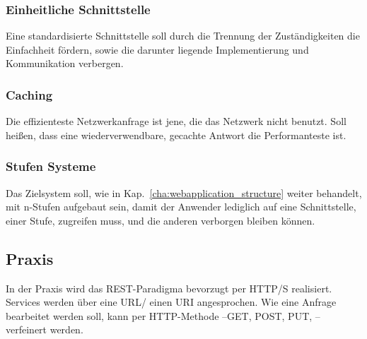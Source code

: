 \subsubsection{Einheitliche Schnittstelle}
Eine standardisierte Schnittstelle soll durch die Trennung der Zuständigkeiten die Einfachheit fördern, sowie die darunter liegende Implementierung und Kommunikation verbergen. 
\subsubsection{Caching}
Die effizienteste Netzwerkanfrage ist jene, die das Netzwerk nicht benutzt.
Soll heißen, dass eine wiederverwendbare, gecachte  Antwort die Performanteste ist. 
\subsubsection{Stufen Systeme}
Das Zielsystem soll, wie in Kap.~\ref{cha:webapplication_structure} weiter behandelt, mit n-Stufen aufgebaut sein, damit der Anwender lediglich auf eine Schnittstelle, einer Stufe, zugreifen muss, und die anderen verborgen bleiben können.

\subsection{Praxis}
In der Praxis wird das REST-Paradigma bevorzugt per HTTP/S realisiert. Services werden über eine URL/ einen URI angesprochen. Wie eine Anfrage bearbeitet werden soll, kann per HTTP-Methode --GET, POST, PUT, \etc -- verfeinert werden. 
